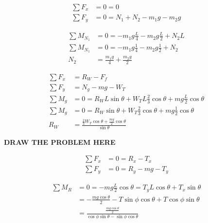 \begin{problem}
    \[
    \begin{aligned}
        \sum F_x &= 0 = 0\\
        \sum F_y &= 0 = N_1+N_2-m_1g-m_2g    
    \end{aligned}
    \]

    \[
        \begin{aligned}
            \sum M_{N_1} &= 0 = -m_1g\frac{L}{4} - m_2g\frac{L}{2} + N_2L\\
            \sum M_{N_1} &= 0 = -m_1g\frac{1}{4} - m_2g\frac{1}{2} + N_2\\
            N_2 &= \frac{m_1g}{4} + \frac{m_2g}{2}
        \end{aligned}
    \]
\end{problem}


\begin{problem}
    \[
    \begin{aligned}
        \sum F_x &= R_W  -F_f\\
        \sum F_y &= N_g - mg - W_T\\
        \sum M_g &= 0 = R_WL\sin\theta + W_TL \frac{2}{3} \cos\theta + mg \frac{L}{2} \cos\theta\\
        \sum M_g &= 0 = R_W\sin\theta + W_T \frac{2}{3} \cos\theta + mg \frac{1}{2} \cos\theta\\
        R_W &= \frac{\frac{2}{3}W_T\cos\theta + \frac{mg}{2}\cos\theta}{\sin\theta}
    \end{aligned}    
    \]
\end{problem}


\begin{problem}
    \textbf{DRAW THE PROBLEM HERE}

    \[
    \begin{aligned}
        \sum F_x &= 0 = R_x - T_x\\
        \sum F_y &= 0 = R_y - mg - T_y
    \end{aligned}    
    \]

    \[
    \begin{aligned}
        \sum M_R &= 0 = -mg\frac{L}{2}\cos\theta = T_yL\cos\theta + T_x\sin\theta\\
        &= -\frac{mg\cos\theta}{2} - T\sin\phi\cos\theta + T\cos\phi\sin\theta\\
        &= \frac{\frac{mg\cos\theta}{2}}{\cos\phi\sin\theta-\sin\phi\cos\theta}
    \end{aligned}    
    \]
\end{problem}
